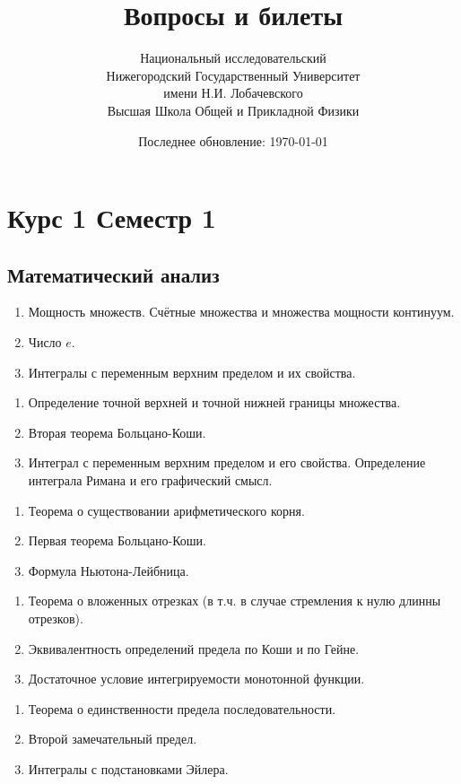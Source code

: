 \documentclass{article}
\title{Вопросы и билеты}
\date{Последнее обновление: \today}
\author{Национальный исследовательский \\
Нижегородский Государственный Университет \\
имени Н.И. Лобачевского \vspace{0.5em} \\
Высшая Школа Общей и Прикладной Физики \vspace{0.5em}}
\newcounter{ticket}[subsection]
\newenvironment{ticket}[1][]{\item[Билет \ifthenelse{\equal{#1}{}}{}{\setcounter{ticket}{#1}}\theticket\refstepcounter{ticket}:]\phantom{}\begin{enumerate}}{\end{enumerate}}
\begin{document}
\maketitle
\section*{Курс 1 Семестр 1}
\subsection*{Математический анализ}
\begin{description}
	\begin{ticket}[1]
		\item Мощность множеств. Счётные множества и множества мощности континуум.
		\item Число $e$.
		\item Интегралы с переменным верхним пределом и их свойства.
	\end{ticket}
	\begin{ticket}
		\item Определение точной верхней и точной нижней границы множества.
		\item Вторая теорема Больцано-Коши.
		\item Интеграл с переменным верхним пределом и его свойства.
		Определение интеграла Римана и его графический смысл.
	\end{ticket}
	\begin{ticket}
		\item Теорема о существовании арифметического корня.
		\item Первая теорема Больцано-Коши.
		\item Формула Ньютона-Лейбница.
	\end{ticket}
	\begin{ticket}
		\item Теорема о вложенных отрезках (в т.ч. в случае стремления к нулю длинны отрезков).
		\item Эквивалентность определений предела по Коши и по Гейне.
		\item Достаточное условие интегрируемости монотонной функции.
	\end{ticket}
	\begin{ticket}[6]
		\item Теорема о единственности предела последовательности.
		\item Второй замечательный предел.
		\item Интегралы с подстановками Эйлера.
	\end{ticket}

\end{description}
\end{document}
